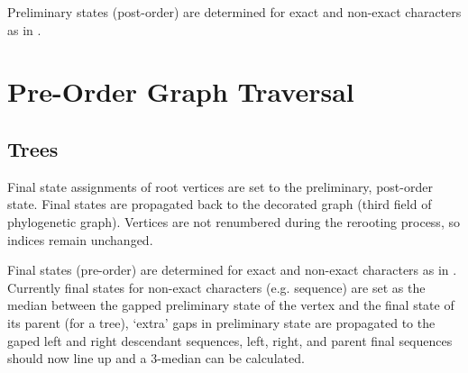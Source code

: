 \documentclass[11pt]{article}
\begin{document}
			Preliminary states (post-order) are determined for exact and non-exact characters as in \cite{Wheeler2012}.
	
	\section{Pre-Order Graph Traversal}
		\subsection{Trees}
		Final state assignments of root vertices are set to the preliminary, post-order state.
		Final  states are propagated back to the decorated graph (third field of phylogenetic graph).
		Vertices are not renumbered during the rerooting process, so indices remain unchanged.
		
		Final states (pre-order) are determined for exact and non-exact characters as in \cite{Wheeler2012}.  Currently final states for 
		non-exact characters (e.g. sequence) are set as the median between the gapped preliminary state of the vertex and the final state of its parent
		(for a tree), `extra' gaps in preliminary state are propagated to the gaped left and right descendant sequences, left, right, and parent final sequences
		should now line up and a 3-median can be calculated.
		
\end{document}
